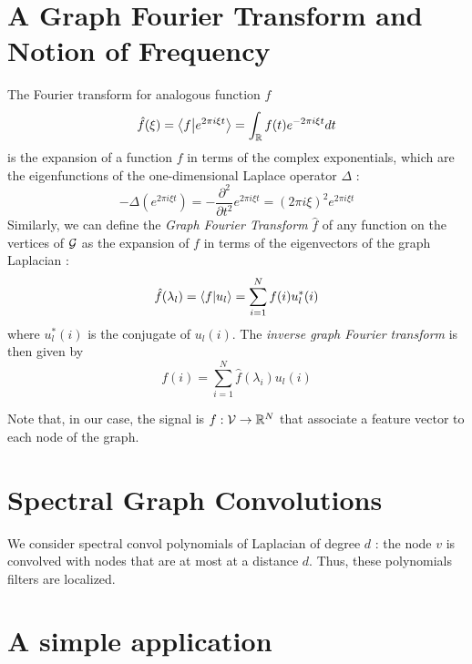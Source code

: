 \documentclass[sigconf]{acmart}
\begin{document}
\section{A Graph Fourier Transform and Notion of Frequency}
The Fourier transform for analogous function $f$
$$
\hat{f}(\xi) = \left \langle f \middle| e^{2\pi i\xi t} \right \rangle = \int_{\mathbb{R}} f(t)e^{-2\pi i \xi t}dt
$$
is the expansion of a function $f$ in terms of the complex exponentials, which are the eigenfunctions of the one-dimensional Laplace operator $\Delta$ :
$$
-\Delta (e^{2\pi i \xi t}) = -\frac{\partial^2}{\partial t^2} e^{2\pi i \xi t} = (2\pi i\xi)^2 e^{2\pi i \xi t}
$$
Similarly, we can define the \textit{Graph Fourier Transform} $\hat{f}$ of any function on the vertices of $\mathcal{G}$ as the expansion of $f$ in terms of the eigenvectors of the graph Laplacian :
\begin{equation}
    \hat{f}(\lambda_l) = \left \langle f \middle| u_l \right \rangle = \sum_{i=1}^{N} f(i)u_l^*(i)
\end{equation}
where $u_l^*(i)$ is the conjugate of $u_l(i)$.
The \textit{inverse graph Fourier transform} is then given by 
\begin{equation}
    f(i) = \sum_{i=1}^{N} \hat{f}(\lambda_i)u_l(i)
\end{equation}

Note that, in our case, the signal is $f:\mathcal{V}\rightarrow\mathbb{R}^N$ that associate a feature vector to each node of the graph.

\section{Spectral Graph Convolutions }

We consider spectral convol \cite{kipf_semi-supervised_2017}
polynomials of Laplacian of degree $d$ : the node $v$ is convolved with nodes that are at most at a distance $d$. Thus, these polynomials filters are localized.
\section{A simple application}



\end{document}
